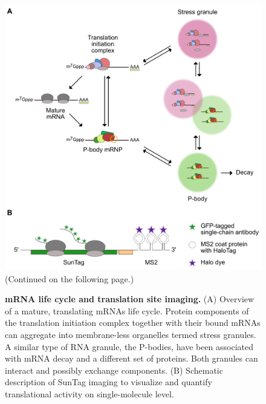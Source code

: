 \begin{figure}[b!]
    \centering
    \includegraphics[width=\linewidth]{images/figure1}
    \caption{(Continued on the following page.)}
    \label{fig:introduction}
    \end{figure}
    \addtocounter{figure}{-1}
    \begin{figure} [t!]
    \caption{\textbf{mRNA life cycle and translation site imaging.}
        (A) Overview of a mature, translating mRNAs life cycle.
            Protein components of the translation initiation complex together with their bound
            mRNAs can aggregate into membrane-less organelles termed stress granules.
            A similar type of RNA granule, the P-bodies, have been associated with mRNA
            decay and a different set of proteins.
            Both granules can interact and possibly exchange components.
        (B) Schematic description of SunTag imaging to visualize and quantify
            translational activity on single-molecule level.
    }
\end{figure}

